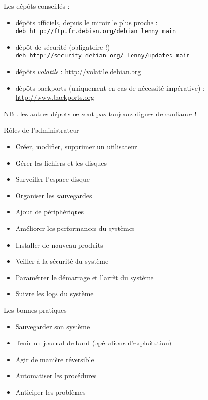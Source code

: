 \documentclass[french]{beamer}
\begin{document}
\begin{frame}
Les dépôts conseillés :
\begin{itemize}
\item dépôts officiels, depuis le miroir le plus proche : \\
 \texttt{deb \url{http://ftp.fr.debian.org/debian} lenny main}
\item dépôt de sécurité (obligatoire !) : \\
 \texttt{deb \url{http://security.debian.org/} lenny/updates main}
\item dépôts \textit{volatile} : \url{http://volatile.debian.org}
\item dépôts backports (uniquement en cas de nécessité impérative) : \url{http://www.backports.org}
\end{itemize}
NB : les autres dépots ne sont pas toujours dignes de confiance !
\end{frame}

\begin{frame}
Rôles de l'administrateur
\begin{itemize}
\item Créer, modifier, supprimer un utilisateur
\item Gérer les fichiers et les disques
\item Surveiller l'espace disque
\item Organiser les sauvegardes
\item Ajout de périphériques
\item Améliorer les performances du systèmes
\item Installer de nouveau produits
\item Veiller à la sécurité du système
\item Paramétrer le démarrage et l'arrêt du système
\item Suivre les logs du système
\end{itemize}
\end{frame}

\begin{frame}
Les bonnes pratiques
\begin{itemize}
\item Sauvegarder son système
\item Tenir un journal de bord (opérations d'exploitation)
\item Agir de manière réversible
\item Automatiser les procédures
\item Anticiper les problèmes
\end{itemize}
\end{frame}
\end{document}
